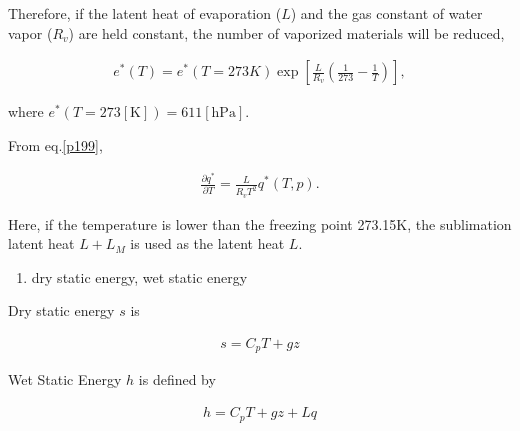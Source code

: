 Therefore, if the latent heat of evaporation (\(L\)) and the gas
constant of water vapor (\(R_v\)) are held constant, the number of
vaporized materials will be reduced,

\begin{eqnarray}
  e^*(T) = e^*(T=273{K})
                      \exp \left[ \frac{L}{R_v}
                            \left( \frac{1}{273} - \frac{1}{T} \right)
                       \right] ,
\end{eqnarray}

where \(e^*(T=273 \mathrm{[K]}) = 611 \mathrm{[hPa]}\).

From eq.\ref{p199},

\begin{eqnarray}
\frac{\partial{q^*}}{\partial {T}} = \frac{L}{R_v T^2} q^*(T,p) .
\end{eqnarray}

Here, if the temperature is lower than the freezing point 273.15K, the
sublimation latent heat \(L+L_M\) is used as the latent heat \(L\).

\begin{enumerate}
\def\labelenumi{\arabic{enumi}.}
\setcounter{enumi}{5}
\tightlist
\item
  dry static energy, wet static energy
\end{enumerate}

Dry static energy \(s\) is

\begin{eqnarray}
  s = C_p T + g z
\end{eqnarray}

Wet Static Energy \(h\) is defined by

\begin{eqnarray}
  h = C_p T + g z + L q
\end{eqnarray}
